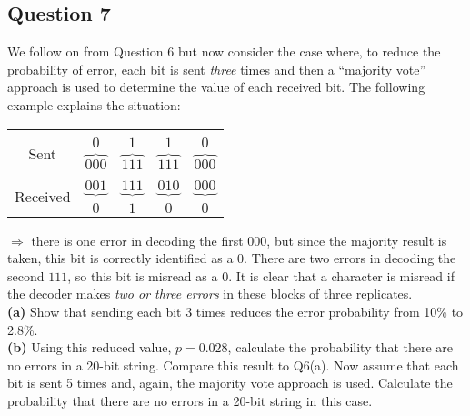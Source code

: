 \subsection*{Question 7}
We follow on from Question 6 but now consider the case where, to reduce the probability of error, each bit is sent \emph{three} times and then a ``majority vote'' approach is used to determine the value of each received bit. The following example explains the situation:\\[-0.5cm]
\begin{center}
	\begin{tabular}{ccccc}
		\hline
		&&&&\\[-0.3cm]
		\multirow{2}{*}{Sent} & $0$ & $1$ & $1$ & $0$ \\
		& $\overbrace{000}$ & $\overbrace{111}$ & $\overbrace{111}$ & $\overbrace{000}$ \\[0.2cm]
		\hline
		&&&&\\[-0.3cm]
		\multirow{2}{*}{Received} & $\underbrace{001}$ & $\underbrace{111}$ & $\underbrace{010}$ & $\underbrace{000}$ \\
		& $0$ & $1$ & $0$ & $0$ \\[0.2cm]
		\hline
	\end{tabular}
\end{center}
$\Rightarrow$ there is one error in decoding the first $000$, but since the majority result is taken, this bit is correctly identified as a $0$. There are two errors in decoding the second $111$, so this bit is misread as a $0$. It is clear that a character is misread if the decoder makes \emph{two or three errors} in these blocks of three replicates.\\[-0.2cm]

{\bf(a)} Show that sending each bit 3 times reduces the error probability from 10\% to 2.8\%. \quad\\ {\bf(b)} Using this reduced value, $p=0.028$, calculate the probability that there are no errors in a 20-bit string. Compare this result to Q6(a).  Now assume that each bit is sent 5 times and, again, the majority vote approach is used. Calculate the probability that there are no errors in a 20-bit string in this case. %
